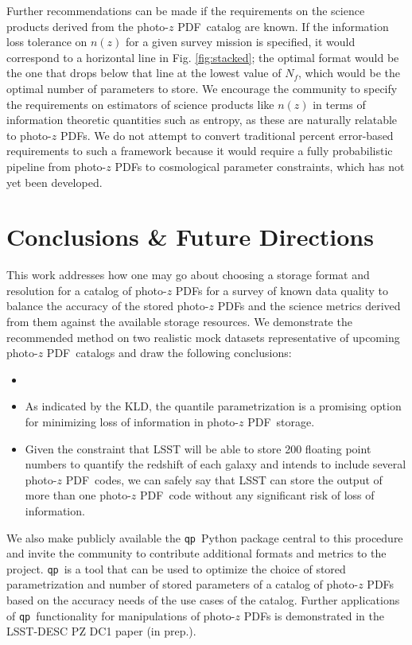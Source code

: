 \documentclass[\docopts]{\docclass}
\newcommand{\qp}{\texttt{qp}}
\newcommand{\pz}{photo-$z$ PDF}
\begin{document}
Further recommendations can be made if the requirements on the science products 
derived from the \pz\ catalog are known.  If the information loss tolerance on 
$n(z)$ for a given survey mission is specified, it would correspond to a 
horizontal line in Fig. \ref{fig:stacked}; the optimal format would be the one 
that drops below that line at the lowest value of $N_{f}$, which would be the 
optimal number of parameters to store.  We encourage the community to specify 
the requirements on estimators of science products like $n(z)$ in terms of 
information theoretic quantities such as entropy, as these are naturally 
relatable to \pz s.  We do not attempt to convert traditional percent 
error-based requirements to such a framework because it would require a fully 
probabilistic pipeline from \pz s to cosmological parameter constraints, which 
has not yet been developed.





\section{Conclusions \& Future Directions}
\label{sec:conclusions}


This work addresses how one may go about choosing a storage format and 
resolution for a catalog of \pz s for a survey of known data quality to balance 
the accuracy of the stored \pz s and the science metrics derived from them 
against the available storage resources.  We demonstrate the recommended method 
on two realistic mock datasets representative of upcoming \pz\ catalogs and 
draw the following conclusions:
\begin{itemize}
  \item
  \item As indicated by the KLD, the quantile parametrization is a promising 
option for minimizing loss of information in \pz\ storage.
  \item Given the constraint that LSST will be able to store 200 floating point 
numbers to quantify the redshift of each galaxy and intends to include several 
\pz\ codes, we can safely say that LSST can store the output of more than one 
\pz\ code without any significant risk of loss of information.
\end{itemize}

We also make publicly available the \qp\ Python package central to this 
procedure and invite the community to contribute additional formats and metrics 
to the project.  \qp\ is a tool that can be used to optimize the choice of 
stored parametrization and number of stored parameters of a catalog of \pz s 
based on the accuracy needs of the use cases of the catalog.  Further 
applications of \qp\ functionality for manipulations of \pz s is demonstrated 
in the LSST-DESC PZ DC1 paper (in prep.).
\end{document}
